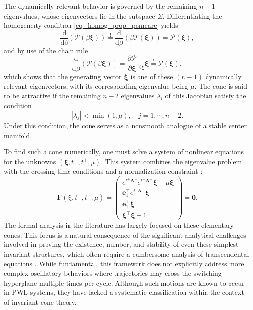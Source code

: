 \documentclass[a4paper,9pt,parskip=half,english]{article}
\theoremstyle{plain}
\theoremstyle{definition}
\newcommand{\T}{^{\!\top}} %
\newcommand{\vxi}{\bm{\xi}}
\newcommand{\ve}{\mathbf e}
\newcommand{\vA}{\mathbf A}
\newcommand{\vF}{\mathbf F}
\begin{document}
The dynamically relevant behavior is governed by the remaining $n-1$ eigenvalues, whose eigenvectors lie in the subspace $\Sigma$. Differentiating the homogeneity condition \eqref{eq_homog_prop_poincare} yields
\begin{equation}
	\frac{\mathrm{d}}{\mathrm{d}\beta} (\mathcal{P}(\beta \vxi)) \stackrel{!}{=} \frac{\mathrm{d}}{\mathrm{d}\beta} (\beta \mathcal{P}(\vxi)) = \mathcal{P}(\vxi), 
\end{equation}
and by use of the chain rule
\begin{equation}
	\frac{\mathrm{d}}{\mathrm{d}\beta} (\mathcal{P}(\beta \vxi)) = \frac{\partial \mathcal{P}}{\partial \vxi}\Bigr|_{\beta \vxi} \vxi \stackrel{!}{=} \mathcal{P}(\vxi),
\end{equation}
which shows that the generating vector $\overline{\vxi}$ is one of these $(n-1)$ dynamically relevant eigenvectors, with its corresponding eigenvalue being $\mu$. The cone is said to be attractive if the remaining $n-2$ eigenvalues $\lambda_j$ of this Jacobian satisfy the condition \cite{Weiss2012}
\begin{equation}\label{eq_attractivity}
	|\lambda_j| < \min(1,\mu), \quad j = 1, \cdots, n-2.
\end{equation}
Under this condition, the cone serves as a nonsmooth analogue of a stable center manifold.

To find such a cone numerically, one must solve a system of nonlinear equations for the unknowns $(\vxi, t^-, t^+, \mu)$. This system combines the eigenvalue problem with the crossing-time conditions and a normalization constraint \cite{Kuepper2008}:
\begin{equation}\label{eq_classic_inv_cone_problem}
	\vF(\vxi,t^-,t^+, \mu) = \begin{pmatrix}
		e^{t^+ \vA^+} e^{t^- \vA^-} \vxi - \mu \vxi \\
		\ve_1\T e^{t^- \vA^- } \vxi \\ 
		\ve_1\T \vxi \\ 
		\vxi\T \vxi - 1 
	\end{pmatrix}\stackrel{!}{=} \bm{0}.
\end{equation}
The formal analysis in the literature has largely focused on these elementary cones. This focus is a natural consequence of the significant analytical challenges involved in proving the existence, number, and stability of even these simplest invariant structures, which often require a cumbersome analysis of transcendental equations \cite{carmona2005bifurcation, Huan2016}. While fundamental, this framework does not explicitly address more complex oscillatory behaviors where trajectories may cross the switching hyperplane multiple times per cycle. Although such motions are known to occur in PWL systems, they have lacked a systematic classification within the context of invariant cone theory.
\end{document}
